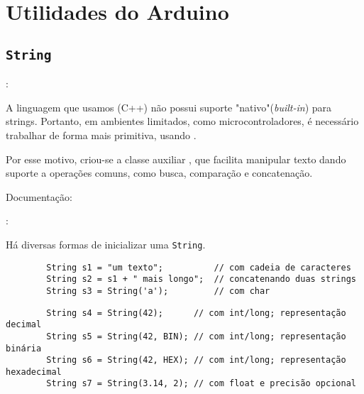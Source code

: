 \section{Utilidades do Arduino}


\subsection{\texttt{String}}


\begin{frame}[b]{\insertsection: \insertsubsection}

	A linguagem que usamos (C++) não possui suporte "nativo"\@ (\textit{built-in}) para strings. Portanto, em ambientes limitados, como microcontroladores, é necessário trabalhar de forma mais primitiva, usando .

	\medskip
	Por esse motivo, criou-se a classe auxiliar , que facilita manipular texto dando suporte a operações comuns, como busca, comparação e concatenação.

	\vfill
	Documentação: 

\end{frame}


\begin{frame}[fragile]{\insertsection: \insertsubsection}

	Há diversas formas de inicializar uma \texttt{String}.

	\begin{verbatim}
		String s1 = "um texto";          // com cadeia de caracteres
		String s2 = s1 + " mais longo";  // concatenando duas strings
		String s3 = String('a');         // com char
	\end{verbatim}

	\begin{verbatim}
		String s4 = String(42);      // com int/long; representação decimal
		String s5 = String(42, BIN); // com int/long; representação binária
		String s6 = String(42, HEX); // com int/long; representação hexadecimal
		String s7 = String(3.14, 2); // com float e precisão opcional
	\end{verbatim}

\end{frame}


